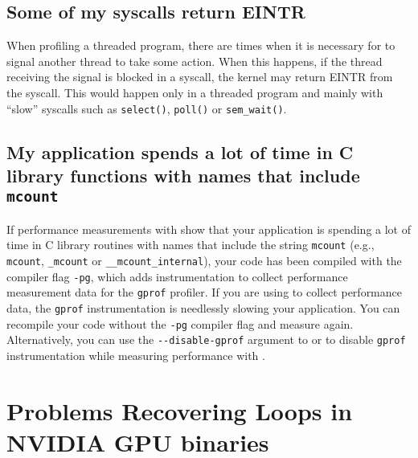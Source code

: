 \documentclass[11pt,twoside,letterpaper]{report}
\begin{document}

\subsection{Some of my syscalls return EINTR}

When profiling a threaded program, there are times when it is
necessary for \hpcrun{} to signal another thread to take some action.
When this happens, if the thread receiving the signal is blocked in a
syscall, the kernel may return EINTR from the syscall.  This would
happen only in a threaded program and mainly with ``slow'' syscalls
such as {\tt select()}, {\tt poll()} or {\tt sem\_wait()}.



\subsection{My application spends a lot of time in C library functions with names that include {\tt mcount}}

If performance measurements with \HPCToolkit{} show that your
application is spending a lot of time in C library routines with
names that include the string {\tt mcount} (e.g., \verb|mcount|, \verb|_mcount| or
\verb|__mcount_internal|), your code has been compiled with the compiler
flag \verb|-pg|, which adds instrumentation to collect performance
measurement data for the \verb|gprof| profiler.  If you are using
\HPCToolkit{} to collect performance data, the \verb|gprof| instrumentation
is needlessly slowing your application. You can recompile your code without the
\verb|-pg| compiler flag and measure again. Alternatively, you can use the \verb|--disable-gprof|
argument to \hpcrun{} or \hpclink{} to disable \verb|gprof| instrumentation while 
measuring performance with \HPCToolkit{}.

\section{Problems Recovering Loops in NVIDIA GPU binaries}
\label{section:hpcstruct-cubin}
\end{document}
